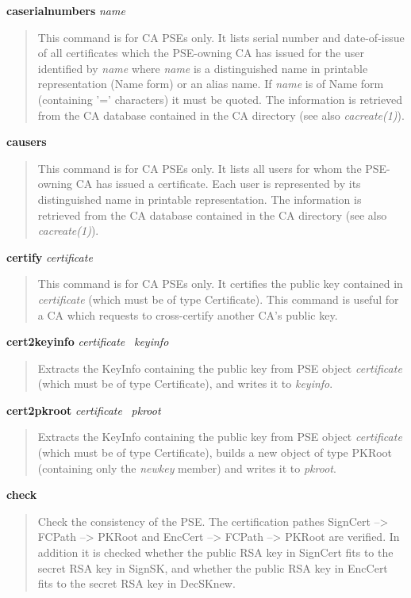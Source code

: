 {\bf caserialnumbers} {\em name}
\begin{quote}
This command is for CA PSEs only.
It lists serial number and date-of-issue of all certificates which the PSE-owning CA has 
issued for the user identified by {\em name} where {\em name} is a distinguished name in 
printable representation (Name form) or an alias name. If {\em name} is of Name form
(containing '=' characters) it must be quoted. The information is retrieved from the 
CA database contained in the CA
directory (see also {\em cacreate(1)}).
\end{quote}

{\bf causers}
\begin{quote}
This command is for CA PSEs only.
It lists all users for whom the PSE-owning CA has issued a certificate. Each user is represented 
by its distinguished name in printable representation. The information is retrieved from the CA database
contained in the CA directory (see also {\em cacreate(1)}).
\end{quote}

{\bf certify} {\em certificate}
\begin{quote}
This command is for CA PSEs only.
It certifies the public key contained in {\em certificate} (which must be of type Certificate).
This command is useful for a CA which requests to cross-certify another CA's public key.
\end{quote}

{\bf cert2keyinfo} {\em certificate}~ {\em keyinfo}
\begin{quote}
Extracts the KeyInfo containing the public key from PSE object {\em certificate} 
(which must be of type Certificate), and writes it to {\em keyinfo}.
\end{quote}

{\bf cert2pkroot} {\em certificate}~ {\em pkroot}
\begin{quote}
Extracts the KeyInfo containing the public key from PSE object {\em certificate} 
(which must be of type Certificate), builds a new object of type PKRoot (containing
only the {\em newkey} member) and writes it to {\em pkroot}.
\end{quote}

{\bf check}
\begin{quote}
Check the consistency of the PSE. The certification pathes SignCert --> FCPath --> PKRoot
and EncCert --> FCPath --> PKRoot are verified. In addition it is checked whether
the public RSA key in SignCert fits to the secret RSA key in SignSK, and whether the
public RSA key in EncCert fits to the secret RSA key in DecSKnew.
\end{quote}

